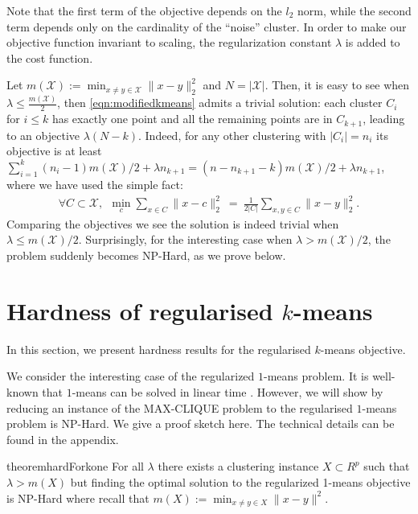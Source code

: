 \documentclass[12pt]{article}
\newcommand{\mc}{\mathcal}
\begin{document}
Note that the first term of the objective depends on the $l_2$ norm, while the second term depends only on the cardinality of the ``noise'' cluster. In order to make our objective function invariant to scaling, the regularization constant $\lambda$ is added to the cost function. 

Let $m(\mc X) := \min_{x\ne y \in \mc X} \|x-y\|_2^2$ and $N = |\mc X|$. Then, it is easy to see when $\lambda \leq \frac{m(\mc X)}{2}$, then \eqref{eqn:modifiedkmeans} admits a trivial solution: each cluster $C_i$ for $i \leq k$ has exactly one point and all the remaining points are in $C_{k+1}$, leading to an objective $\lambda (N-k)$. Indeed, for any other clustering with $|C_i| = n_i$ its objective is at least $\sum_{i=1}^k (n_i-1) m(\mc X)/2 + \lambda n_{k+1} = (n-n_{k+1} - k) m(\mc X)/2 + \lambda n_{k+1}$, where we have used the simple fact:
\begin{align}
\forall C \subset \mc X, ~~
\min_{c} \sum_{x \in C} \|x - c\|_2^2 ~=~ \frac{1}{2|C|}\sum_{x, y \in C} \|x - y\|_2^2.
\end{align}
Comparing the objectives we see the solution is indeed trivial when $\lambda \leq m(\mc X) /2$. Surprisingly, for the interesting case when $\lambda > m(\mc X) /2$, the problem suddenly becomes NP-Hard, as we prove below.





\section{Hardness of regularised $k$-means}
\label{section:hardness}

In this section, we present hardness results for the regularised $k$-means objective. 

We consider the interesting case of the regularized $1$-means problem. It is well-known that $1$-means can be solved in linear time \cite{Bellman73}. However, we will show by reducing an instance of the MAX-CLIQUE problem to the regularised $1$-means problem is NP-Hard. We give a proof sketch here. The technical details can be found in the appendix.

\begin{restatable}{theorem}{hardForkone}
\label{theorem:hardFork1}
For all $\lambda$ there exists a clustering instance $X \subset R^p$ such that $\lambda > m(X)$ but finding the optimal solution to the regularized 1-means objective is NP-Hard where recall that $m(X) := \min_{x\ne y \in X} \|x-y\|^2$.
\end{restatable}
\end{document}
